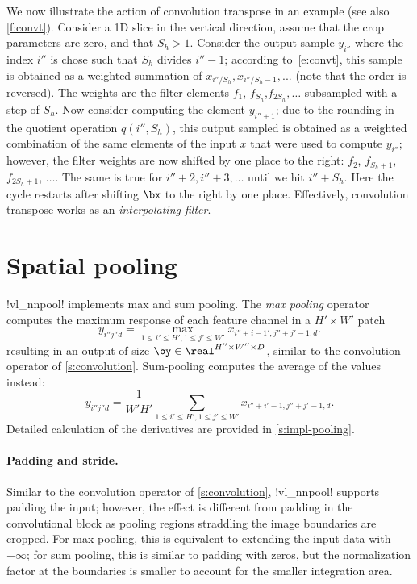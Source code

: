 We now illustrate the action of convolution transpose in an example (see also \autoref{f:convt}).  Consider a 1D slice in the vertical direction, assume that the crop parameters are zero, and that $S_h>1$. Consider the output sample $y_{i''}$ where the index $i''$ is chose such that $S_h$ divides $i''-1$; according to~\eqref{e:convt}, this sample is obtained as a weighted summation of $x_{i'' / S_h},x_{i''/S_h-1},...$ (note that the order is reversed). The weights are the filter elements $f_1$, $f_{S_h}$,$f_{2S_h},\dots$ subsampled with a step of $S_h$. Now consider computing the element $y_{i''+1}$; due to the rounding in the quotient operation $q(i'',S_h)$, this output sampled is obtained as a weighted combination of the same elements of the input $x$ that were used to compute $y_{i''}$; however, the filter weights are now shifted by one place to the right: $f_2$, $f_{S_h+1}$,$f_{2S_h+1}$, $\dots$. The same is true for $i''+2, i'' + 3,\dots$ until we hit $i'' + S_h$. Here the cycle restarts after shifting $\bx$ to the right by one place. Effectively, convolution transpose works as an \emph{interpolating filter}.

\section{Spatial pooling}\label{s:pooling}

!vl_nnpool! implements max and sum pooling. The \emph{max pooling} operator computes the maximum response of each feature channel in a $H' \times W'$ patch
\[
y_{i''j''d} = \max_{1\leq i' \leq H', 1 \leq j' \leq W'} x_{i''+i-1',j''+j'-1,d}.
\]
resulting in an output of size $\by\in\real^{H''\times W'' \times D}$, similar to the convolution operator of \autoref{s:convolution}. Sum-pooling computes the average of the values instead:
\[
y_{i''j''d} = \frac{1}{W'H'}
\sum_{1\leq i' \leq H', 1 \leq j' \leq W'} x_{i''+i'-1,j''+j'-1,d}.
\]
Detailed calculation of the derivatives are provided in \autoref{s:impl-pooling}.

\paragraph{Padding and stride.} Similar to the convolution operator of \autoref{s:convolution}, !vl_nnpool! supports padding the input; however, the effect is different from padding in the convolutional block as pooling regions straddling the image boundaries are cropped. For max pooling, this is equivalent to extending the input data with $-\infty$; for sum pooling, this is similar to padding with zeros, but the normalization factor at the boundaries is smaller to account for the smaller integration area.

